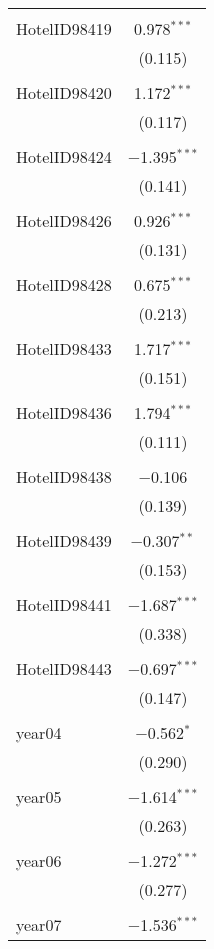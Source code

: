 \documentclass{article}
\begin{document}
\begin{table}[!htbp]
\begin{tabular}{@{\extracolsep{5pt}}lc}
		& \\ 
		HotelID98419 & 0.978$^{***}$ \\ 
		& (0.115) \\ 
		& \\ 
		HotelID98420 & 1.172$^{***}$ \\ 
		& (0.117) \\ 
		& \\ 
		HotelID98424 & $-$1.395$^{***}$ \\ 
		& (0.141) \\ 
		& \\ 
		HotelID98426 & 0.926$^{***}$ \\ 
		& (0.131) \\ 
		& \\ 
		HotelID98428 & 0.675$^{***}$ \\ 
		& (0.213) \\ 
		& \\ 
		HotelID98433 & 1.717$^{***}$ \\ 
		& (0.151) \\ 
		& \\ 
		HotelID98436 & 1.794$^{***}$ \\ 
		& (0.111) \\ 
		& \\ 
		HotelID98438 & $-$0.106 \\ 
		& (0.139) \\ 
		& \\ 
		HotelID98439 & $-$0.307$^{**}$ \\ 
		& (0.153) \\ 
		& \\ 
		HotelID98441 & $-$1.687$^{***}$ \\ 
		& (0.338) \\ 
		& \\ 
		HotelID98443 & $-$0.697$^{***}$ \\ 
		& (0.147) \\ 
		& \\ 
		year04 & $-$0.562$^{*}$ \\ 
		& (0.290) \\ 
		& \\ 
		year05 & $-$1.614$^{***}$ \\ 
		& (0.263) \\ 
		& \\ 
		year06 & $-$1.272$^{***}$ \\ 
		& (0.277) \\ 
		& \\ 
		year07 & $-$1.536$^{***}$ \\ 

\end{tabular}
\end{table}
\end{document}
